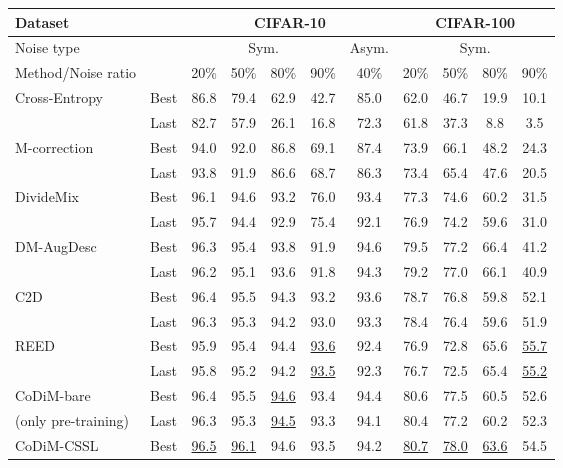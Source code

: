 \documentclass[letterpaper]{article} \usepackage{aaai22}  \usepackage{times}  \usepackage{helvet}  \usepackage{courier}  \usepackage[hyphens]{url}  \usepackage{graphicx} \usepackage{subfigure}
\begin{document}
\begin{table*}[h]
\begin{center}
\begin{tabular}{lcccccccccc}
\hline
Dataset&  & \multicolumn{5}{c}{CIFAR-10} & \multicolumn{4}{c}{CIFAR-100} \\
\hline
Noise type & & \multicolumn{4}{c}{Sym.}& Asym.  & \multicolumn{4}{c}{Sym.} \\
\hline
Method/Noise ratio & & 20\% & 50\% & 80\% & 90\% & 40\% & 20\% & 50\% & 80\% & 90\% \\
\hline 
\multirow{2}{*}{Cross-Entropy} & Best & 86.8 & 79.4 & 62.9 & 42.7 & 85.0 & 62.0 & 46.7 & 19.9 & 10.1 \\
 & Last & 82.7 & 57.9 & 26.1 & 16.8 & 72.3 & 61.8 & 37.3 & 8.8 & 3.5 \\
\multirow{2}{*}{M-correction \cite{arazo2019unsupervised}} & Best & 94.0 & 92.0 & 86.8 & 69.1 & 87.4 & 73.9 & 66.1 & 48.2 & 24.3 \\
 & Last & 93.8 & 91.9 & 86.6 & 68.7 & 86.3 & 73.4 & 65.4 & 47.6 & 20.5 \\
\multirow{2}{*}{DivideMix \cite{li2020dividemix}} & Best & 96.1 & 94.6 & 93.2 & 76.0 & 93.4 & 77.3 & 74.6 & 60.2 & 31.5 \\
 & Last & 95.7 & 94.4 & 92.9 & 75.4 & 92.1 & 76.9 & 74.2 & 59.6 & 31.0 \\
\multirow{2}{*}{DM-AugDesc \cite{nishi2021augmentation}} & Best & 96.3 & 95.4 & 93.8 & 91.9 & 94.6 & 79.5 & 77.2 & 66.4 & 41.2 \\
 & Last & 96.2 & 95.1 & 93.6 & 91.8 & 94.3 & 79.2 & 77.0 & 66.1 & 40.9 \\
\multirow{2}{*}{C2D \cite{zheltonozhskii2021contrast}} & Best & 96.4 & 95.5 & 94.3 & 93.2 & 93.6 & 78.7 & 76.8 & 59.8 & 52.1 \\
 & Last & 96.3 & 95.3 & 94.2 & 93.0 & 93.3 & 78.4 & 76.4 & 59.6 & 51.9 \\
\multirow{2}{*}{REED \cite{zhang2020decoupling}} & Best & 95.9 & 95.4 & 94.4 & \underline{93.6} & 92.4 & 76.9 & 72.8 & 65.6 & \underline{55.7} \\
 & Last & 95.8 & 95.2 & 94.2 & \underline{93.5} & 92.3 & 76.7 & 72.5 & 65.4 & \underline{55.2} \\
\hline
CoDiM-bare & Best & 96.4 & 95.5 & \underline{94.6} & 93.4 & 94.4 & 80.6 & 77.5 & 60.5 & 52.6 \\
(only pre-training) & Last & 96.3 & 95.3 & \underline{94.5} & 93.3 & 94.1 & 80.4 & 77.2 & 60.2 & 52.3 \\
\hline
CoDiM-CSSL & Best & \underline{96.5} & \underline{96.1} & 94.6 & 93.5 & 94.2 & \underline{80.7} & \underline{78.0} & \underline{63.6} & 54.5 \\

\end{tabular}
\end{center}
\end{table*}
\end{document}
